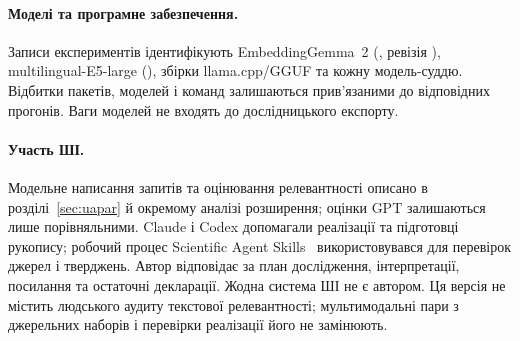 \paragraph{Моделі та програмне забезпечення.}
Записи експериментів ідентифікують EmbeddingGemma~2 (, ревізія ), multilingual-E5-large (), збірки llama.cpp/GGUF та кожну модель-суддю. Відбитки пакетів, моделей і команд залишаються прив'язаними до відповідних прогонів. Ваги моделей не входять до дослідницького експорту.

\paragraph{Участь ШІ.}
Модельне написання запитів та оцінювання релевантності описано в розділі~\ref{sec:uapar} й окремому аналізі розширення; оцінки GPT залишаються лише порівняльними. Claude і Codex допомагали реалізації та підготовці рукопису; робочий процес Scientific Agent Skills~\citep{kassis2026skills} використовувався для перевірок джерел і тверджень. Автор відповідає за план дослідження, інтерпретації, посилання та остаточні декларації. Жодна система ШІ не є автором. Ця версія не містить людського аудиту текстової релевантності; мультимодальні пари з джерельних наборів і перевірки реалізації його не замінюють.
